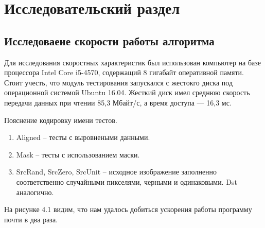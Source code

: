 \chapter{Исследовательский раздел}

\section{Исследоваеие скорости работы алгоритма}

Для исследования скоростных характеристик был использован компьютер на базе процессора Intel Core i5-4570, содержащий 8 гигабайт оперативной памяти. Стоит учесть, что модуль тестирования запускался с жестокго диска под операционной системой Ubuntu 16.04. Жесткий диск имел среднюю скорость передачи данных при чтении 85,3 Мбайт/с, а время доступа — 16,3 мс. 

\begin{figure}[ht!]
\end{figure}

Пояснение кодировку имени тестов. 
\begin{enumerate}
\item Aligned -- тесты с выровнеными данными.
\item Mask -- тесты с использованием маски.
\item SrcRand, SrcZero, SrcUnit -- исходное изображение заполненно соответственно случайными пикселями, черными и одинаковыми. Dst аналогично.
\end{enumerate}

На рисунке 4.1 видим, что нам удалось добиться ускорения работы программу почти в два раза.
